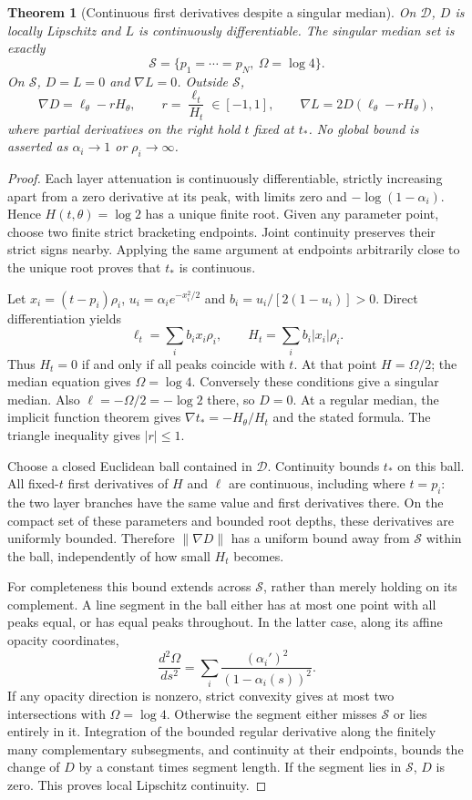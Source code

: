 \documentclass[11pt,a4paper]{article}
\newtheorem{theorem}{Theorem}
\begin{document}
\begin{theorem}[Continuous first derivatives despite a singular median]
On $\mathcal D$, $D$ is locally Lipschitz and $L$ is continuously
differentiable. The singular median set is exactly
\[
 \mathcal S=\{p_1=\cdots=p_N,\ \Omega=\log4\}.
\]
On $\mathcal S$, $D=L=0$ and $\nabla L=0$. Outside $\mathcal S$,
\[
 \nabla D=\ell_\theta-rH_\theta,\qquad
 r=\frac{\ell_t}{H_t}\in[-1,1],\qquad
 \nabla L=2D(\ell_\theta-rH_\theta),
\]
where partial derivatives on the right hold $t$ fixed at $t_*$.
No global bound is asserted as $\alpha_i\to1$ or $\rho_i\to\infty$.
\end{theorem}
\begin{proof}
Each layer attenuation is continuously differentiable, strictly increasing
apart from a zero derivative at its peak, with limits zero and
$-\log(1-\alpha_i)$. Hence $H(t,\theta)=\log2$ has a unique finite root.
Given any parameter point, choose two finite strict bracketing endpoints.
Joint continuity preserves their strict signs nearby. Applying the same
argument at endpoints arbitrarily close to the unique root proves that
$t_*$ is continuous.

Let $x_i=(t-p_i)\rho_i$, $u_i=\alpha_i e^{-x_i^2/2}$ and
$b_i=u_i/[2(1-u_i)]>0$. Direct differentiation yields
\[
 \ell_t=\sum_i b_i x_i\rho_i,\qquad
 H_t=\sum_i b_i|x_i|\rho_i.
\]
Thus $H_t=0$ if and only if all peaks coincide with $t$.
At that point $H=\Omega/2$; the median equation gives
$\Omega=\log4$. Conversely these conditions give a singular median.
Also $\ell=-\Omega/2=-\log2$ there, so $D=0$.
At a regular median, the implicit function theorem gives
$\nabla t_*=-H_\theta/H_t$ and the stated formula. The triangle
inequality gives $|r|\leq1$.

Choose a closed Euclidean ball contained in $\mathcal D$. Continuity
bounds $t_*$ on this ball. All fixed-$t$ first derivatives of $H$ and
$\ell$ are continuous, including where $t=p_i$: the two layer branches
have the same value and first derivatives there. On the compact set of
these parameters and bounded root depths, these derivatives are uniformly
bounded. Therefore $\|\nabla D\|$ has a uniform bound away from
$\mathcal S$ within the ball, independently of how small $H_t$ becomes.

For completeness this bound extends across $\mathcal S$, rather than
merely holding on its complement. A line segment in the ball either has
at most one point with all peaks equal, or has equal peaks throughout.
In the latter case, along its affine opacity coordinates,
\[
 \frac{d^2\Omega}{ds^2}
 =\sum_i\frac{(\alpha_i')^2}{(1-\alpha_i(s))^2}.
\]
If any opacity direction is nonzero, strict convexity gives at most two
intersections with $\Omega=\log4$. Otherwise the segment either misses
$\mathcal S$ or lies entirely in it. Integration of the bounded regular
derivative along the finitely many complementary subsegments, and
continuity at their endpoints, bounds the change of $D$ by a constant
times segment length. If the segment lies in $\mathcal S$, $D$ is zero.
This proves local Lipschitz continuity.


\end{proof}
\end{document}
